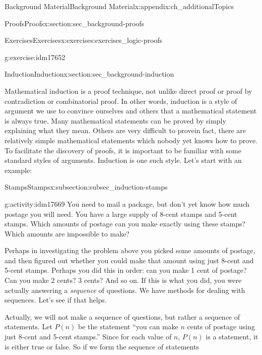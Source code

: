 \documentclass[oneside,10pt,]{book}
\numberwithin{equation}{chapter}
\begin{document}
\begin{appendixptx}{Background Material}{}{Background Material}{}{}{x:appendix:ch_additionalTopics}
\begin{sectionptx}{Proofs}{}{Proofs}{}{}{x:section:sec_background-proofs}
\begin{exercises-subsection}{Exercises}{}{Exercises}{}{}{x:exercises:exercises_logic-proofs}
\begin{divisionexercise}{20}{}{}{g:exercise:idm17652}
\begin{sidebyside}{1}{0.4}{0.4}{0}
\end{sidebyside}%
\end{divisionexercise}%
\end{exercises-subsection}
\end{sectionptx}
%
%
\typeout{************************************************}
\typeout{************************************************}
%
\begin{sectionptx}{Induction}{}{Induction}{}{}{x:section:sec_background-induction}
\begin{introduction}{}%
 Mathematical induction is a proof technique, not unlike direct proof or proof by contradiction or combinatorial proof. In other words, induction is a style of argument we use to convince ourselves and others that a mathematical statement is always true. Many mathematical statements can be proved by simply explaining what they mean. Others are very difficult to prove\textemdash{}in fact, there are relatively simple mathematical statements which nobody yet knows how to prove. To facilitate the discovery of proofs, it is important to be familiar with some standard styles of arguments. Induction is one such style. Let's start with an example:%
\end{introduction}%
%
%
\typeout{************************************************}
\typeout{************************************************}
%
\begin{subsectionptx}{Stamps}{}{Stamps}{}{}{x:subsection:subsec_induction-stamps}
\begin{activity}{}{g:activity:idm17669}%
You need to mail a package, but don't yet know how much postage you will need. You have a large supply of 8-cent stamps and 5-cent stamps. Which amounts of postage can you make exactly using these stamps? Which amounts are impossible to make?%
\end{activity}
Perhaps in investigating the problem above you picked some amounts of postage, and then figured out whether you could make that amount using just 8-cent and 5-cent stamps. Perhaps you did this in order: can you make 1 cent of postage? Can you make 2 cents? 3 cents? And so on. If this is what you did, you were actually answering a \emph{sequence} of questions. We have methods for dealing with sequences. Let's see if that helps.%
\par
Actually, we will not make a sequence of questions, but rather a sequence of statements. Let \(P(n)\)\label{g:notation:idm17675} be the statement ``you can make \(n\) cents of postage using just 8-cent and 5-cent stamps.'' Since for each value of \(n\), \(P(n)\) is a statement, it is either true or false. So if we form the sequence of statements%

\end{subsectionptx}
\end{sectionptx}
\end{appendixptx}
\end{document}
